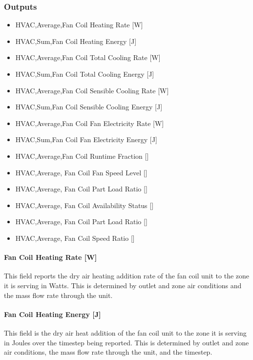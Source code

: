 \subsubsection{Outputs}\label{outputs-1-033}

\begin{itemize}
\item
  HVAC,Average,Fan Coil Heating Rate {[}W{]}
\item
  HVAC,Sum,Fan Coil Heating Energy {[}J{]}
\item
  HVAC,Average,Fan Coil Total Cooling Rate {[}W{]}
\item
  HVAC,Sum,Fan Coil Total Cooling Energy {[}J{]}
\item
  HVAC,Average,Fan Coil Sensible Cooling Rate {[}W{]}
\item
  HVAC,Sum,Fan Coil Sensible Cooling Energy {[}J{]}
\item
  HVAC,Average,Fan Coil Fan Electricity Rate {[}W{]}
\item
  HVAC,Sum,Fan Coil Fan Electricity Energy {[}J{]}
\item
  HVAC,Average,Fan Coil Runtime Fraction {[]}
\item
  HVAC,Average, Fan Coil Fan Speed Level {[]}
\item
  HVAC,Average, Fan Coil Part Load Ratio {[]}
\item
  HVAC,Average, Fan Coil Availability Status {[]}
\item
  HVAC,Average, Fan Coil Part Load Ratio {[]}
\item
  HVAC,Average, Fan Coil Speed Ratio {[]}
\end{itemize}

\paragraph{Fan Coil Heating Rate {[}W{]}}\label{fan-coil-heating-rate-w}

This field reports the dry air heating addition rate of the fan coil unit to the zone it is serving in Watts. This is determined by outlet and zone air conditions and the mass flow rate through the unit.

\paragraph{Fan Coil Heating Energy {[}J{]}}\label{fan-coil-heating-energy-j}

This field is the dry air heat addition of the fan coil unit to the zone it is serving in Joules over the timestep being reported. This is determined by outlet and zone air conditions, the mass flow rate through the unit, and the timestep.

